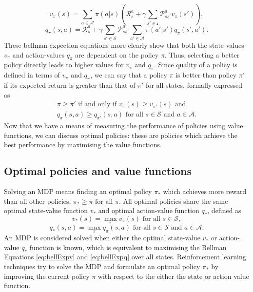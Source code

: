 \begin{equation}
   v_\pi(s) = \sum_{a \in \mathcal{A}} \pi(a|s) (\mathcal{R}_{s}^{a} + \gamma \sum_{s' \in \mathcal{s}} \mathcal{P}_{ss'}^{a} v_\pi(s')),
   \label{eq:bellExpv}
\end{equation}
\begin{equation}
   q_\pi(s,a) = \mathcal{R}_s^a + \gamma \sum_{s'\in\mathcal{S}}\mathcal{P}_{ss'}^a \sum_{a'\in\mathcal{A}}\pi(a'|s')q_\pi(s',a').
   \label{eq:bellExpq}
\end{equation}
These bellman expection equations more clearly show that both the state-values $v_\pi$ and action-values $q_\pi$ are dependent on the policy $\pi$. Thus, selecting a better policy directly leads to higher values for $v_\pi$ and $q_\pi$. Since quality of a policy is defined in terms of $v_\pi$ and $q_\pi$, we can say that a policy $\pi$ is better than policy $\pi'$ if its expected return is greater than that of $\pi'$ for all states, formally expressed as
\begin{equation}
\begin{split}
    \pi \geq \pi' \text{ if and only if } v_\pi(s) \geq v_{\pi'}(s) \text{ and } \\
    q_\pi(s,a) \geq q_{\pi'}(s,a) \text{ for all } s \in \mathcal{S} \text{ and } a \in \mathcal{A}.
\end{split}
\end{equation}
Now that we have a means of measuring the performance of policies using value functions, we can discuss optimal policies: these are policies which achieve the best performance by maximising the value functions.

\subsection{Optimal policies and value functions}
Solving an MDP means finding an optimal policy $\pi_*$ which achieves more reward than all other policies,
$\pi_* \geq \pi \text{ for all } \pi$. All optimal policies share the same optimal state-value function $v_*$ 
and optimal action-value function $q_*$, defined as 
\begin{equation}
    v_*(s)=\max_\pi v_\pi(s) \text{ for all } s \in \mathcal{S},
\label{eq:v_*(s)}
\end{equation}
\begin{equation}
    q_*(s,a)=\max_\pi q_\pi(s,a) \text{ for all } s \in \mathcal{S} \text{ and } a \in \mathcal{A}.
\label{eq:q_*(s,a)}
\end{equation}
An MDP is considered solved when either the optimal state-value $v_*$ or action-value $q_*$ function is known, which is equivalent to maximising the Bellman Equations \ref{eq:bellExpv} and \ref{eq:bellExpq} over all states.
Reinforcement learning techniques try to solve the MDP and formulate an optimal policy $\pi_*$ by improving the current policy $\pi$ with respect to the either the state or action value function.


